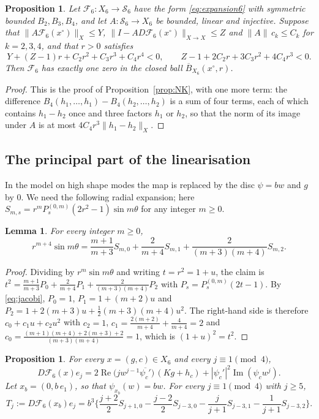 \documentclass[11pt]{amsart}
\newtheorem{proposition}[theorem]{Proposition}
\newtheorem{lemma}[theorem]{Lemma}
\theoremstyle{definition}
\theoremstyle{remark}
\numberwithin{equation}{section}
\newcommand{\Sc}{\mathcal{S}}
\newcommand{\Fc}{\mathcal{F}}
\DeclareMathOperator{\re}{Re}
\DeclareMathOperator{\im}{Im}
\newcommand{\nrm}[1]{\lVert #1\rVert}
\begin{document}
\begin{proposition}\label{prop:NK6}
Let $\Fc_6\colon X_6\to\Sc_6$ have the form \eqref{eq:expansion6} with symmetric bounded $B_2,B_3,B_4$, and let $A\colon\Sc_6\to X_6$ be bounded, linear and injective. Suppose that $\nrm{A\Fc_6(x^\circ)}_X\leq Y$, $\nrm{I-AD\Fc_6(x^\circ)}_{X\to X}\leq Z$ and $\nrm A\,c_k\leq C_k$ for $k=2,3,4$, and that $r>0$ satisfies
\begin{equation}\label{eq:radii6}
Y+(Z-1)r+C_2r^2+C_3r^3+C_4r^4<0,\qquad Z-1+2C_2r+3C_3r^2+4C_4r^3<0 .
\end{equation}
Then $\Fc_6$ has exactly one zero in the closed ball $\overline B_{X_6}(x^\circ,r)$.
\end{proposition}

\begin{proof}
This is the proof of Proposition~\ref{prop:NK}, with one more term: the difference $B_4(h_1,\ldots,h_1)-B_4(h_2,\ldots,h_2)$ is a sum of four terms, each of which contains $h_1-h_2$ once and three factors $h_1$ or $h_2$, so that the norm of its image under $A$ is at most $4C_4r^3\nrm{h_1-h_2}_X$.
\end{proof}

\subsection{The principal part of the linearisation}
In the model on high shape modes the map is replaced by the disc $\psi=bw$ and $g$ by $0$. We need the following radial expansion; here $S_{m,s}=r^mP^{(0,m)}_s(2r^2-1)\sin m\theta$ for any integer $m\geq0$.

\begin{lemma}\label{lem:radial4}
For every integer $m\geq0$,
\[
r^{m+4}\sin m\theta=\frac{m+1}{m+3}S_{m,0}+\frac2{m+4}S_{m,1}+\frac2{(m+3)(m+4)}S_{m,2}.
\]
\end{lemma}

\begin{proof}
Dividing by $r^m\sin m\theta$ and writing $t=r^2=1+u$, the claim is $t^2=\frac{m+1}{m+3}P_0+\frac2{m+4}P_1+\frac2{(m+3)(m+4)}P_2$ with $P_s=P_s^{(0,m)}(2t-1)$. By \eqref{eq:jacobi}, $P_0=1$, $P_1=1+(m+2)u$ and $P_2=1+2(m+3)u+\frac12(m+3)(m+4)u^2$. The right-hand side is therefore $c_0+c_1u+c_2u^2$ with $c_2=1$, $c_1=\frac{2(m+2)}{m+4}+\frac4{m+4}=2$ and $c_0=\frac{(m+1)(m+4)+2(m+3)+2}{(m+3)(m+4)}=1$, which is $(1+u)^2=t^2$.
\end{proof}

\begin{proposition}\label{prop:principal6}
For every $x=(g,c)\in X_6$ and every $j\equiv1\pmod4$,
\begin{equation}\label{eq:DFej}
D\Fc_6(x)e_j=2\re\big(jw^{j-1}\overline{\psi_c'}\big)\,(Kg+h_c)+|\psi_c'|^2\im(\psi_cw^j).
\end{equation}
Let $x_b=(0,b\,e_1)$, so that $\psi_{x_b}(w)=bw$. For every $j\equiv1\pmod4$ with $j\geq5$,
\begin{equation}\label{eq:Tj6}
T_j:=D\Fc_6(x_b)e_j=b^3\Big\{\frac{j+2}2S_{j+1,0}-\frac{j-2}2S_{j-3,0}-\frac j{j+1}S_{j-3,1}-\frac1{j+1}S_{j-3,2}\Big\}.
\end{equation}
\end{proposition}
\end{document}
